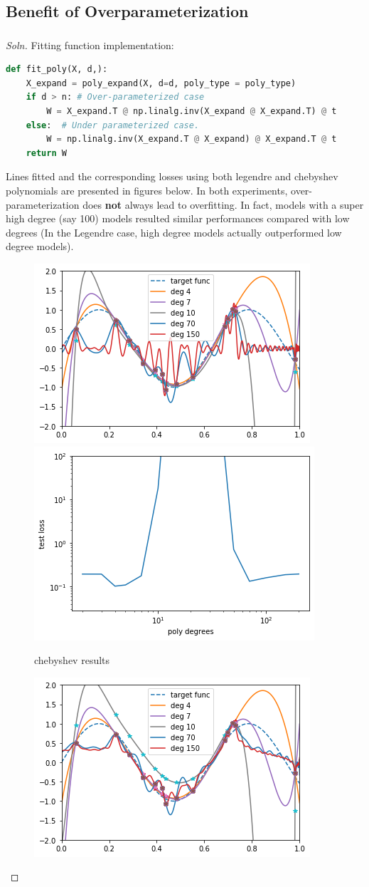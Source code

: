 \documentclass{article}
\begin{document}
	\subsection{Benefit of Overparameterization}
	\subsubsection{}
	\begin{proof}[Soln]
	Fitting function implementation:
	\begin{lstlisting}[language=Python]
def fit_poly(X, d,):
    X_expand = poly_expand(X, d=d, poly_type = poly_type)
    if d > n: # Over-parameterized case
        W = X_expand.T @ np.linalg.inv(X_expand @ X_expand.T) @ t
    else:  # Under parameterized case.
        W = np.linalg.inv(X_expand.T @ X_expand) @ X_expand.T @ t
    return W
	\end{lstlisting}
	Lines fitted and the corresponding losses using both legendre and chebyshev polynomials are presented in figures below. In both experiments, over-parameterization does \textbf{not} always lead to overfitting. In fact, models with a super high degree (say 100) models resulted similar performances compared with low degrees (In the Legendre case, high degree models actually outperformed low degree models).
		\begin{figure}[H]
			\center
			\includegraphics[width=0.45\linewidth]{chebyshev_fit.png}
			\includegraphics[width=0.45\linewidth]{chebyshev_loss.png}
			\caption{chebyshev results}
		\end{figure}
		\begin{figure}[H]
			\center
			\includegraphics[width=0.45\linewidth]{legendre_fit.png}

\end{figure}
\end{proof}
\end{document}
